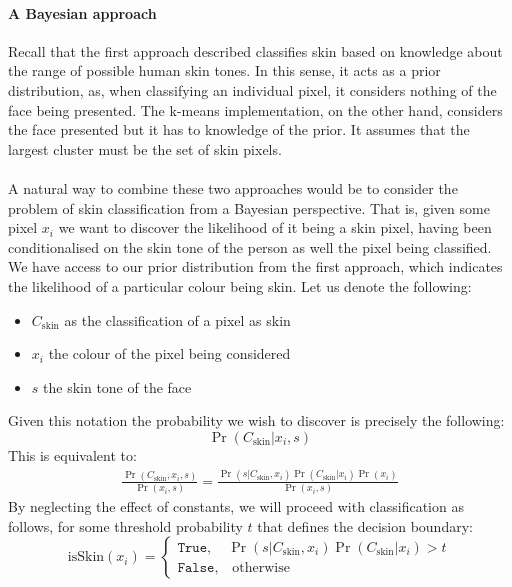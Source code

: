 \paragraph{A Bayesian approach}
Recall that the first approach described classifies skin based on knowledge about the range of possible human skin tones. 
In this sense, it acts as a prior distribution, as, when classifying an individual pixel, it considers nothing of the face being presented.
The k-means implementation, on the other hand, considers the face presented but it has to knowledge of the prior. It assumes that the largest cluster must be the set of skin pixels.
\\ \\ 
A natural way to combine these two approaches would be to consider the problem of skin classification from a Bayesian perspective. That is, given some pixel $x_i$ we want to discover the likelihood of it being a skin pixel, having been conditionalised on the skin tone of the person as well the pixel being classified. 
We have access to our prior distribution from the first approach, which indicates the likelihood of a particular colour being skin.
Let us denote the following: 
\begin{itemize}
   \item $C_{\mathrm{skin}}$ as the classification of a pixel as skin
   \item $x_i$ the colour of the pixel being considered
   \item $s$ the skin tone of the face
\end{itemize} 
Given this notation the probability we wish to discover is precisely the following:
\begin{equation*}
   \Pr(C_{\mathrm{skin}}| x_i, s) 
\end{equation*}
This is equivalent to:
\begin{align*}
   \frac{\Pr(C_\mathrm{skin}, x_i, s)}{\Pr(x_i, s)} = \frac{\Pr(s|C_\mathrm{skin}, x_i)\Pr(C_\mathrm{skin}|x_i)\Pr(x_i)}{\Pr(x_i,s)}
\end{align*}
By neglecting the effect of constants, we will proceed with classification as follows, for some threshold probability $t$ that defines the decision boundary: 
\begin{equation*}
    \text{isSkin}(x_i) = 
    \begin{cases}
        \texttt{True}, \quad \Pr(s|C_\mathrm{skin}, x_i)\Pr(C_\mathrm{skin}|x_i) > t \\
        \texttt{False}, \quad \text{otherwise}
    \end{cases}
\end{equation*}
\\ \\ 
